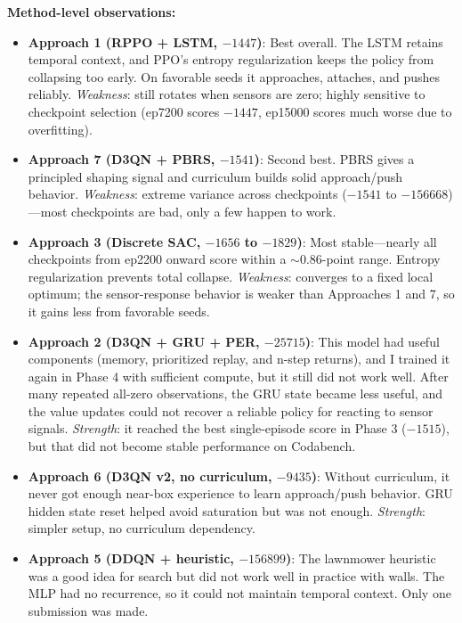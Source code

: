 \documentclass[10.5pt, oneside]{article}
\begin{document}
\noindent \textbf{Method-level observations:}
\begin{itemize}[nosep]
    \item \textbf{Approach 1 (RPPO + LSTM, $-1447$)}: Best overall. The LSTM retains temporal context, and PPO's entropy regularization keeps the policy from collapsing too early. On favorable seeds it approaches, attaches, and pushes reliably. \textit{Weakness}: still rotates when sensors are zero; highly sensitive to checkpoint selection (ep7200 scores $-1447$, ep15000 scores much worse due to overfitting).
    \item \textbf{Approach 7 (D3QN + PBRS, $-1541$)}: Second best. PBRS gives a principled shaping signal and curriculum builds solid approach/push behavior. \textit{Weakness}: extreme variance across checkpoints ($-1541$ to $-156668$)---most checkpoints are bad, only a few happen to work.
    \item \textbf{Approach 3 (Discrete SAC, $-1656$ to $-1829$)}: Most stable---nearly all checkpoints from ep2200 onward score within a $\sim$0.86-point range. Entropy regularization prevents total collapse. \textit{Weakness}: converges to a fixed local optimum; the sensor-response behavior is weaker than Approaches 1 and 7, so it gains less from favorable seeds.
    \item \textbf{Approach 2 (D3QN + GRU + PER, $-25715$)}: This model had useful components (memory, prioritized replay, and n-step returns), and I trained it again in Phase 4 with sufficient compute, but it still did not work well. After many repeated all-zero observations, the GRU state became less useful, and the value updates could not recover a reliable policy for reacting to sensor signals. \textit{Strength}: it reached the best single-episode score in Phase 3 ($-1515$), but that did not become stable performance on Codabench.
    \item \textbf{Approach 6 (D3QN v2, no curriculum, $-9435$)}: Without curriculum, it never got enough near-box experience to learn approach/push behavior. GRU hidden state reset helped avoid saturation but was not enough. \textit{Strength}: simpler setup, no curriculum dependency.
    \item \textbf{Approach 5 (DDQN + heuristic, $-156899$)}: The lawnmower heuristic was a good idea for search but did not work well in practice with walls. The MLP had no recurrence, so it could not maintain temporal context. Only one submission was made.
\end{itemize}
\end{document}
